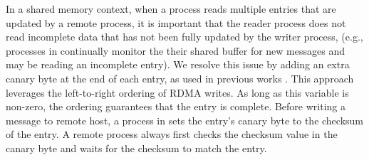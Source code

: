 In a shared memory context, when a process reads multiple entries that are
updated by a remote process, it is important that the reader process does not
read incomplete data that has not been fully updated by the writer process,
(e.g., processes in \libname continually monitor the their shared buffer for new
messages and may be reading an incomplete entry). We resolve this issue by
adding an extra canary byte at the end of each entry, as used in previous works \cite{APUS,FaRM,kalia2014using,
islam2012high}. This
approach leverages the left-to-right ordering of RDMA writes. As long as this
variable is non-zero, the ordering guarantees that the entry is complete.
Before writing a message to remote host, a process in \libname sets the entry's
canary byte to the checksum of the entry. A remote process always first checks
the checksum value in the canary byte and waits for the checksum to match the
entry.


%
%
